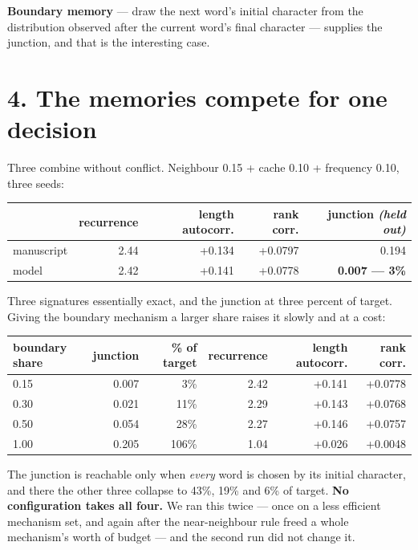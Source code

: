 \documentclass[11pt,a4paper]{article}
\begin{document}
\textbf{Boundary memory} --- draw the next word's initial character from the distribution observed after the current word's final character --- supplies the junction, and that is the interesting case.


\section*{4. The memories compete for one decision}


Three combine without conflict. Neighbour 0.15 + cache 0.10 + frequency 0.10, three seeds:


\begin{table}[htbp]\centering\small
\begin{tabular}{@{}lrrrr@{}}
\toprule
 & recurrence & length autocorr. & rank corr. & junction \emph{(held out)} \\
\midrule
manuscript & 2.44 & +0.134 & +0.0797 & 0.194 \\
model & 2.42 & +0.141 & +0.0778 & \textbf{0.007 --- 3\%} \\
\bottomrule
\end{tabular}
\end{table}


Three signatures essentially exact, and the junction at three percent of target. Giving the boundary mechanism a larger share raises it slowly and at a cost:


\begin{table}[htbp]\centering\small
\begin{tabular}{@{}lrrrrr@{}}
\toprule
boundary share & junction & \% of target & recurrence & length autocorr. & rank corr. \\
\midrule
0.15 & 0.007 & 3\% & 2.42 & +0.141 & +0.0778 \\
0.30 & 0.021 & 11\% & 2.29 & +0.143 & +0.0768 \\
0.50 & 0.054 & 28\% & 2.27 & +0.146 & +0.0757 \\
1.00 & 0.205 & 106\% & 1.04 & +0.026 & +0.0048 \\
\bottomrule
\end{tabular}
\end{table}


The junction is reachable only when \emph{every} word is chosen by its initial character, and there the other three collapse to 43\%, 19\% and 6\% of target. \textbf{No configuration takes all four.} We ran this twice --- once on a less efficient mechanism set, and again after the near-neighbour rule freed a whole mechanism's worth of budget --- and the second run did not change it.
\end{document}

